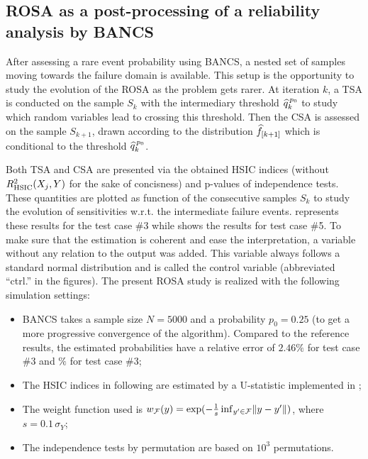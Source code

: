 \subsection{ROSA as a post-processing of a reliability analysis by BANCS}

After assessing a rare event probability using BANCS, a nested set of samples moving towards the failure domain is available.
This setup is the opportunity to study the evolution of the ROSA as the problem gets rarer.
At iteration $k$, a TSA is conducted on the sample $S_k$ with the intermediary threshold $\widehat{q}^{\, p_0}_k$ to study which random variables lead to crossing this threshold. 
Then the CSA is assessed on the sample $S_{k+1}$, drawn according to the distribution $\widehat{f}_{[k+1]}$ which is conditional to the threshold $\widehat{q}^{\, p_0}_k$. 

Both TSA and CSA are presented via the obtained HSIC indices (without $R^2_{\mathrm{HSIC}}(X_j, Y)$ for the sake of concisness) and p-values of independence tests. 
These quantities are plotted as function of the consecutive samples $S_k$ to study the evolution of sensitivities w.r.t. the intermediate failure events. 
 represents these results for the test case \#3 while  shows the results for test case \#5. 
To make sure that the estimation is coherent and ease the interpretation, a variable without any relation to the output was added. 
This variable always follows a standard normal distribution and is called the control variable (abbreviated ``ctrl.'' in the figures). 
The present ROSA study is realized with the following simulation settings:
\begin{itemize}
    \item BANCS takes a sample size $N=5000$ and a probability $p_0=0.25$ (to get a more progressive convergence of the algorithm). Compared to the reference results, the estimated probabilities have a relative error of $2.46\%$ for test case \#3 and $\%$ for test case \#3; 
    \item The HSIC indices in following are estimated by a U-statistic implemented in \ot; 
    \item The weight function used is $w_{\mathcal{F}}(y) = \exp(-\frac1s \, \mathrm{inf}_{y'\in \mathcal{F}} \Vert y -y' \Vert)$, where $s=0.1 \, \sigma_Y$;
    \item The independence tests by permutation are based on $10^3$ permutations.
\end{itemize}


